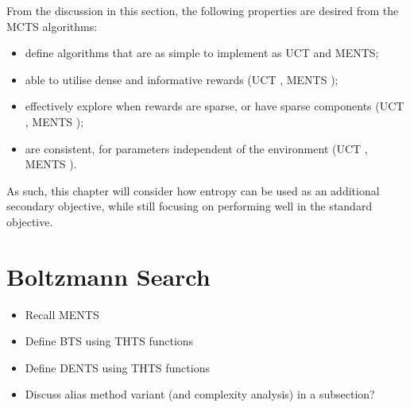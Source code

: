     From the discussion in this section, the following properties are desired from the MCTS algorithms:
    \begin{itemize}
        \item define algorithms that are as simple to implement as UCT and MENTS;
        \item able to utilise dense and informative rewards (UCT \tick, MENTS \tick);
        \item effectively explore when rewards are sparse, or have sparse components (UCT \cross, MENTS \tick);
        \item are consistent, for parameters independent of the environment (UCT \tick, MENTS \cross). 
    \end{itemize}

    As such, this chapter will consider how entropy can be used as an additional secondary objective, while still focusing on performing well in the standard objective. 









\section{Boltzmann Search}
\label{sec:4-2-boltzmannsearch}

    \begin{itemize}
        \item Recall MENTS
        \item Define BTS using THTS functions
        \item Define DENTS using THTS functions
        \item Discuss alias method variant (and complexity analysis) in a subsection?
    \end{itemize}







